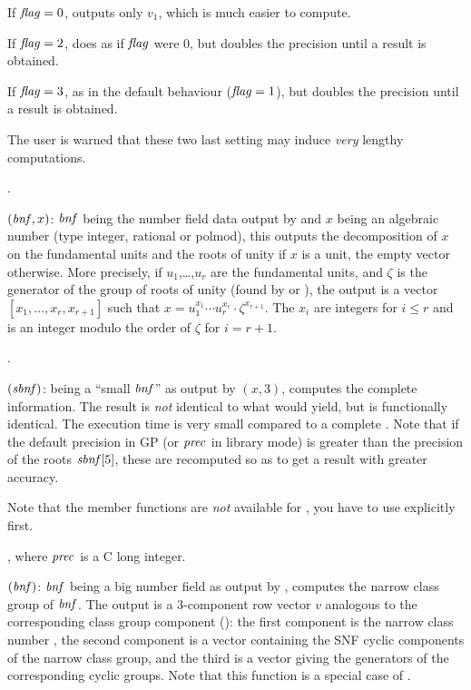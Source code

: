 If $\hbox{\it f\kern0pt lag\/}=0$, outputs only $v_1$, which is much easier to compute.

If $\hbox{\it f\kern0pt lag\/}=2$, does as if $\hbox{\it f\kern0pt lag\/}$ were $0$, but doubles the precision until a
result is obtained.

If $\hbox{\it f\kern0pt lag\/}=3$, as in the default behaviour ($\hbox{\it f\kern0pt lag\/}=1$), but doubles the precision
until a result is obtained.

The user is warned that these two last setting may induce \emph{very} lengthy
computations.

.

$(\hbox{\it bnf\/},x)$: $\hbox{\it bnf\/}$ being the number field data
output by
 and $x$ being an algebraic number (type integer, rational or
polmod), this outputs the decomposition of $x$ on the fundamental units and
the roots of unity if $x$ is a unit, the empty vector otherwise. More
precisely, if $u_1$,\dots,$u_r$ are the fundamental units, and $\zeta$ is
the generator of the group of roots of unity (found by  or
), the output is a vector $[x_1,\dots,x_r,x_{r+1}]$ such that
$x=u_1^{x_1}\cdots u_r^{x_r}\cdot\zeta^{x_{r+1}}$. The $x_i$ are integers for
$i\le r$ and is an integer modulo the order of $\zeta$ for $i=r+1$.

.

$(\hbox{\it sbnf\/})$:  being a ``small $\hbox{\it bnf\/}$''
as output by $(x,3)$, computes the complete 
information. The result is \emph{not} identical to what  would
yield, but is functionally identical. The execution time is very small
compared to a complete . Note that if the default precision in
GP (or $\hbox{\it prec\/}$ in library mode) is greater than the precision of the
roots $\hbox{\it sbnf\/}[5]$, these are recomputed so as to get a result with
greater accuracy.

Note that the member functions are \emph{not} available for , you
have to use  explicitly first.

, where $\hbox{\it prec\/}$ is a
C long integer.

$(\hbox{\it bnf\/})$: $\hbox{\it bnf\/}$ being a big number field as
output by , computes the narrow class group of $\hbox{\it bnf\/}$. The
output is a 3-component row vector $v$ analogous to the corresponding
class group component  (): the
first component is the narrow class number , the second component
is a vector containing the SNF cyclic components
 of the narrow
class group, and the third is a vector giving the generators of the
corresponding  cyclic groups. Note that this function is a
special case of .

